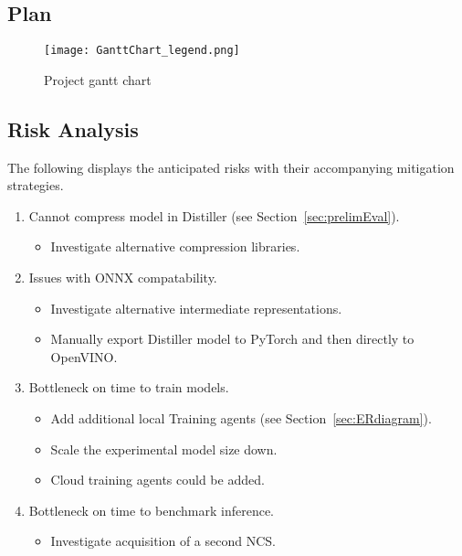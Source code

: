 \documentclass[../D1.tex]{subfiles}
\begin{document}
\subsection{Plan}

\begin{figure}[h]
    \texttt{[image: GanttChart\_legend.png]}
    \caption{Project gantt chart}
    \label{fig:ganttChart}
\end{figure}

\subsection{Risk Analysis}
The following displays the anticipated risks with their accompanying mitigation strategies.
\begin{enumerate}[label={\textbf{R\theenumi}},leftmargin=*]
    \item Cannot compress model in Distiller (see Section~\ref{sec:prelimEval}). 
    \begin{itemize}
        \item Investigate alternative compression libraries.
    \end{itemize}

    \item Issues with ONNX compatability.
    \begin{itemize}
        \item Investigate alternative intermediate representations.
        \item Manually export Distiller model to PyTorch and then directly to OpenVINO.
    \end{itemize}

    \item Bottleneck on time to train models.
    \begin{itemize}
        \item Add additional local Training agents (see Section~\ref{sec:ERdiagram}).
        \item Scale the experimental model size down.
        \item Cloud training agents could be added.
    \end{itemize}

    \item Bottleneck on time to benchmark inference.
    \begin{itemize}
        \item Investigate acquisition of a second NCS.
    \end{itemize}


\end{enumerate}
\end{document}
